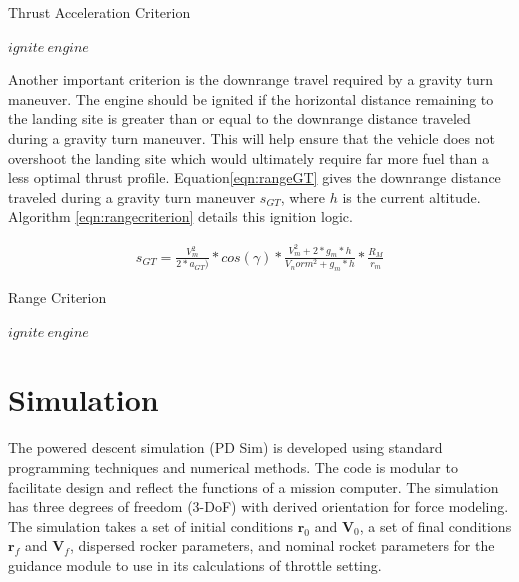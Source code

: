 \begin{algorithm}
	\caption{Thrust Acceleration Criterion}\label{eqn:thrustcriterion}
	\begin{algorithmic}[1]
			\State $ ignite\: engine $
		\EndIf
	\end{algorithmic}
\end{algorithm}

Another important criterion is the downrange travel required by a gravity turn maneuver. The engine should be ignited if the horizontal distance remaining to the landing site is greater than or equal to the downrange distance traveled during a gravity turn maneuver. This will help ensure that the vehicle does not overshoot the landing site which would ultimately require far more fuel than a less optimal thrust profile. Equation\ref{eqn:rangeGT} gives the downrange distance traveled during a gravity turn maneuver $s_{GT}$, where $h$ is the current altitude. Algorithm \ref{eqn:rangecriterion} details this ignition logic.

\begin{equation}
\label{eqn:rangeGT}
\begin{split}
s_{GT} = \frac{V_m^2}{2*a_{GT})}*cos(\gamma)*\frac{V_m^2+2*g_m*h}{V_norm^2+g_m*h}*\frac{R_M}{r_m}
\end{split}
\end{equation}

\begin{algorithm}
	\caption{Range Criterion}\label{eqn:rangecriterion}
	\begin{algorithmic}[1]
			\State $ ignite\: engine $
		\EndIf
	\end{algorithmic}
\end{algorithm}

\section{Simulation}

The powered descent simulation (PD Sim) is developed using standard programming techniques and numerical methods. The code is modular to facilitate design and reflect the functions of a mission computer. The simulation has three degrees of freedom (3-DoF) with derived orientation for force modeling. The simulation takes a set of initial conditions $\bm{r}_0$ and $\bm{V}_0$, a set of final conditions $\bm{r}_f$ and $\bm{V}_f$, dispersed rocker parameters, and nominal rocket parameters for the guidance module to use in its calculations of throttle setting.

